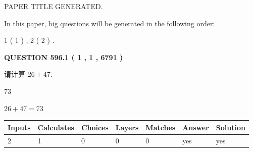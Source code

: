 \documentclass{ctexart}
\begin{document}
   
 \vspace{0.2in}
 
 
 
 
   
   
 PAPER TITLE GENERATED.
   
   
   
\vspace{0.2in}
   
In this paper, big questions will be generated in the following order: 
   
   
   1 ( 1 )
 ,
   2 ( 2 )
 .
  
\vspace{0.2in}
  
{\textbf{\Large{QUESTION
596.1 
 ( 1 , 1 , 6791 )
}}}
  
  
 
请计算 $ %
26 +  %
47 $.
 
 
 
\noindent{}
 
 

73
 
 
\noindent{}
 
 

 
 
 
\noindent{}
 
 

$ %
26 +  %
47=   %
73$
 
 
\noindent{}
 
 

 
   
   
   
   
\noindent\begin{tabular}{|l|l|l|l|l|l|l|}
 \hline
Inputs & Calculates & Choices & Layers & Matches & Answer & Solution \\ \hline
 2  & 
 1  & 
 0
  & 
 0  & 
 0  & 
  yes & 
  yes 
  \\ \hline
 \end{tabular}
   
   
   
   
\noindent{}
   
   
  
\end{document}
